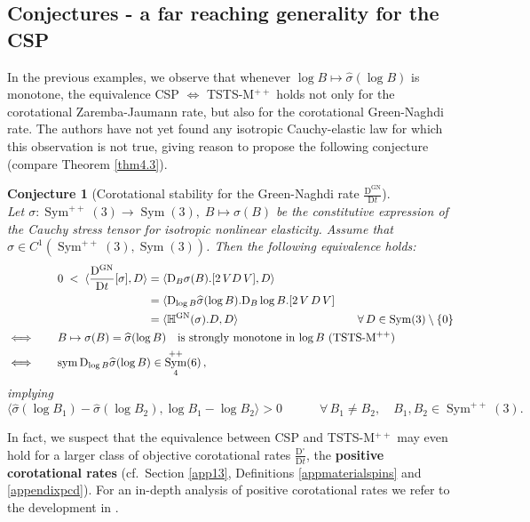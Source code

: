 \documentclass[10pt]{article}
\newcounter{theoremCounter}
\numberwithin{theoremCounter}{section}
\theoremstyle{plain}
\newtheorem{conjecture}[theoremCounter]{Conjecture}
\theoremstyle{definition}
\newcommand{\DD}{\mathrm{D}}
\DeclareMathOperator{\Sym}{Sym}
\DeclareMathOperator{\sym}{sym}
\DeclareMathOperator{\GN}{GN}
\def\H{\mathbb{H}}
\numberwithin{equation}{section}
\begin{document}
\subsection{Conjectures - a far reaching generality for the CSP}
%
In the previous examples, we observe that whenever $\log B \mapsto \widehat \sigma(\log B)$ is monotone, the equivalence \break CSP $\iff$ TSTS-M$^{++}$ holds not only for the corotational Zaremba-Jaumann rate, but also for the corotational Green-Naghdi rate. The authors have not yet found any isotropic Cauchy-elastic law for which this observation is not true, giving reason to propose the following conjecture (compare Theorem \ref{thm4.3}).
%
	\begin{conjecture}[Corotational stability for the Green-Naghdi rate $\frac{\DD^{\GN}}{\DD t}$]~\\
	Let $\sigma\colon \Sym^{++}(3) \to \Sym(3), \; B \mapsto \sigma(B)$ be the constitutive expression of the Cauchy stress tensor for isotropic nonlinear elasticity. Assume that $\sigma \in C^1(\Sym^{++}(3), \Sym(3))$. Then the following equivalence holds:
	\begin{equation}
		\begin{alignedat}{2}
		&0 \;<\; \langle \frac{\DD^{\GN}}{\DD t}[\sigma], D \rangle &&= \langle \DD_B \sigma(B) . [2 \, V D \, V] , D \rangle \\&&&= \langle \DD_{\log B} \widehat \sigma(\log B). \DD_B \log B. [2 \, V \, D \, V] \\
		&&&= \mathrlap{\langle \H^{\GN}(\sigma).D, D \rangle} \hphantom{\langle \DD_{\log B} \widehat \sigma(\log B). \DD_B \log B. [2 \, V \, D \, V]} \qquad \forall \, D \in \Sym(3) \setminus \{0\} \\
		\iff \qquad &\mathrlap{B \mapsto \sigma(B) = \widehat{\sigma}(\log B) \quad \textnormal{is strongly monotone in $\log B$ (TSTS-M$^{++}$)}} \\
		\iff \qquad &\mathrlap{\sym \DD_{\log B} \widehat \sigma(\log B) \in \Sym^{++}_4(6)\,,}
		\end{alignedat}
	\end{equation}
	implying
		\begin{equation}
		\langle \widehat{\sigma}(\log B_1) - \widehat{\sigma}(\log B_2), \log B_1 - \log B_2 \rangle > 0 \qquad \quad \forall \, B_1 \neq B_2, \quad B_1, B_2 \in \Sym^{++}(3).
		\end{equation}
	\end{conjecture}
%
In fact, we suspect that the equivalence between CSP and TSTS-M$^{++}$ may even hold for a larger class of objective corotational rates $\frac{\DD^{\circ}}{\DD t}$, the \textbf{positive corotational rates} (cf.~Section \ref{app13}, Definitions \ref{appmaterialspins} and \ref{appendixpcd}). For an in-depth analysis of positive corotational rates we refer to the development in \cite{neffkoro2024}.
\end{document}
